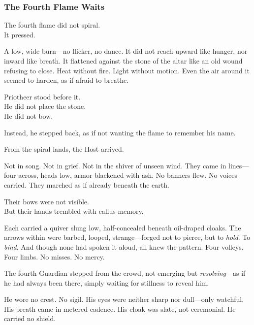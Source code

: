 \documentclass[12pt]{article}
\begin{document}
\vspace{.5in}

\subsubsection*{The Fourth Flame Waits}

The fourth flame did not spiral.\\
It pressed.

\vspace{0.5em}
A low, wide burn---no flicker, no dance. It did not reach upward like hunger, nor inward like breath. It flattened against the stone of the altar like an old wound refusing to close. Heat without fire. Light without motion. Even the air around it seemed to harden, as if afraid to breathe.

\vspace{0.5em}
Priotheer stood before it.\\
He did not place the stone.\\
He did not bow.

\vspace{0.5em}
Instead, he stepped back, as if not wanting the flame to remember his name.

\vspace{0.5em}
From the spiral lands, the Host arrived.

\vspace{0.5em}
Not in song. Not in grief. Not in the shiver of unseen wind. They came in lines---four across, heads low, armor blackened with ash. No banners flew. No voices carried. They marched as if already beneath the earth.

\vspace{0.5em}
Their bows were not visible.\\
But their hands trembled with callus memory.

\vspace{0.5em}
Each carried a quiver slung low, half-concealed beneath oil-draped cloaks. The arrows within were barbed, looped, strange---forged not to pierce, but to \textit{hold}. To \textit{bind}. And though none had spoken it aloud, all knew the pattern. Four volleys. Four limbs. No misses. No mercy.

\vspace{0.5em}
The fourth Guardian stepped from the crowd, not emerging but \textit{resolving}---as if he had always been there, simply waiting for stillness to reveal him.

\vspace{0.5em}
He wore no crest. No sigil. His eyes were neither sharp nor dull---only watchful. His breath came in metered cadence. His cloak was slate, not ceremonial. He carried no shield.
\end{document}
